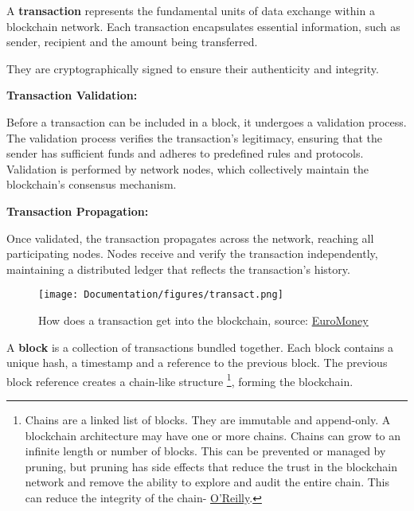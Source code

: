 A \textbf{transaction} represents the fundamental units of data exchange within a blockchain network. Each transaction encapsulates essential information, such as sender, recipient and the amount being transferred.

They are cryptographically signed to ensure their authenticity and integrity.\newline

\textbf{Transaction Validation:}\newline

Before a transaction can be included in a block, it undergoes a validation process.
The validation process verifies the transaction's legitimacy, ensuring that the sender has sufficient funds and adheres to predefined rules and protocols.
Validation is performed by network nodes, which collectively maintain the blockchain's consensus mechanism.\newline

\textbf{Transaction Propagation:}\newline

Once validated, the transaction propagates across the network, reaching all participating nodes.
Nodes receive and verify the transaction independently, maintaining a distributed ledger that reflects the transaction's history.\newline


\begin{figure}[htbp]
	\centering
	\texttt{[image: Documentation/figures/transact.png]}  %
	\caption{How does a transaction get into the blockchain, source: \href{https://www.euromoney.com/learning/blockchain-explained/how-transactions-get-into-the-blockchain}{EuroMoney}}
	\label{fig:trans}
\end{figure}

A \textbf{block} is a collection of transactions bundled together.
Each block contains a unique hash, a timestamp and a reference to the previous block.
The previous block reference creates a chain-like structure \footnote{Chains are a linked list of blocks. They are immutable and append-only. A blockchain architecture may have one or more chains. Chains can grow to an infinite length or number of blocks. This can be prevented or managed by pruning, but pruning has side effects that reduce the trust in the blockchain network and remove the ability to explore and audit the entire chain. This can reduce the integrity of the chain- \href{https://www.oreilly.com/library/view/hands-on-smart-contract/9781492086116/ch01.html}{O'Reilly}.}, forming the blockchain.\newline


